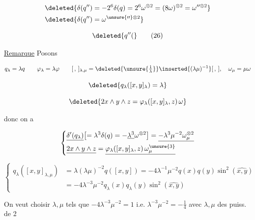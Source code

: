 

\[
\begin{aligned}&\deleted{\delta(q'')=-2^6\delta(q)=2^6\omega^{\otimes2}=(8\omega)^{\otimes2}=\omega''^{\otimes2}}\\&\deleted{\delta(q'')=\omega^{\unsure{\prime\prime}\otimes2}}\end{aligned}
\]


\[
\deleted{q''(}\tag*{(26)}
\]

\uline{Remarque} Posons

\[
q_\lambda=\lambda q\qquad\varphi_\lambda=\lambda\varphi\qquad [\,,\,]_{\lambda,\mu}=\deleted{\unsure{\tfrac1{\lambda}}}\inserted{(\lambda\mu)^{-1}}[\,,\,],\quad\omega_\mu=\mu\omega
\]


\[
\deleted{q_\lambda([x,y]_\lambda)=\lambda}
\]

\[
\deleted{2x\wedge y\wedge z=\varphi_\lambda([x,y]_\lambda,z)\,\omega}
\]

donc on a

\[
\left\{\begin{aligned}&\underline{\delta'(q_\lambda)}\bigl[=\lambda^3\delta(q)=-\underline{\lambda^3}\omega^{\otimes2}\bigr]=\underline{-\lambda^3\mu^{-2}\omega_\mu^{\otimes2}}\\ &\underline{2x\wedge y\wedge z}=\underline{\varphi_\lambda([x,y]_\lambda,z)\,\omega_\mu^{\unsure{3}}}\end{aligned}\right.
\]

\[
\left\{\begin{aligned}q_\lambda([x,y]_{\lambda,\mu})&=\lambda(\lambda\mu)^{-2}q([x,y])=-4\lambda^{-1}\mu^{-2}q(x)q(y)\sin^2(\widehat{x,y})\\ &=-4\lambda^{-3}\mu^{-2}q_\lambda(x)q_\lambda(y)\sin^2(\widehat{x,y})\end{aligned}\right.
\]

On veut choisir $\lambda,\mu$ tels que $-4\lambda^{-3}\mu^{-2}=1$ i.e. $\lambda^{-3}\mu^{-2}=-\frac14$ avec $\lambda,\mu$ des  puiss. de 2


